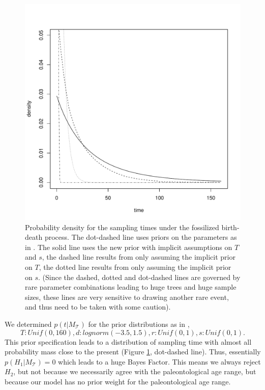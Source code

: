 \documentclass[11pt]{article}
\begin{document}
\begin{figure}
\includegraphics[width=12cm]{priors.pdf}
\caption{\label{hist8_older}Probability density for the sampling times under the fossilized birth-death process. The dot-dashed line uses priors on the parameters as in \cite{gavryushkina2015bayesian}. 
The solid line uses the new prior with implicit assumptions on $T$ and $s$, the dashed line results from only assuming the implicit prior on $T$, the dotted line results from only assuming the  implicit prior on $s$. 
(Since the dashed, dotted and dot-dashed lines are governed by rare parameter combinations leading to huge trees and huge sample sizes, these lines are very sensitive to drawing another rare event, and thus need to be taken with some caution).}
\label{Fig:Prior}
\end{figure}

We determined $p(t|M_\mathcal{T})$ for the prior distributions as in \cite{gavryushkina2015bayesian}, 
$$T: Unif(0,160), d: lognorm(-3.5,1.5), r: Unif(0,1), s: Unif(0,1).$$ This prior specification leads to a distribution of sampling time with almost all probability mass close to the present (Figure \ref{Fig:Prior}, dot-dashed line). Thus, essentially $p(H_1|M_\mathcal{T})=0$  which leads to a huge Bayes Factor. This means we always reject $H_2$, but not because we necessarily agree with the paleontological age range, but because our model has no prior weight for the paleontological age range.
\end{document}
